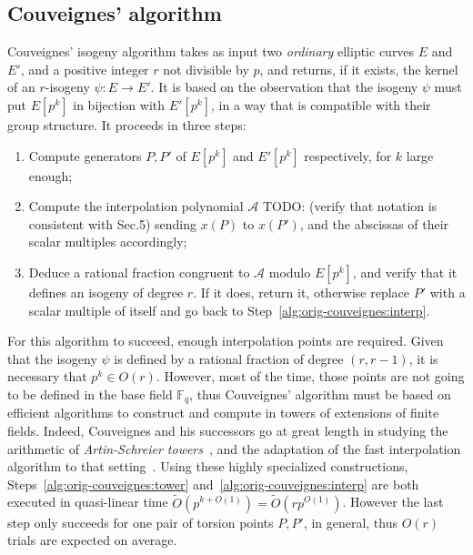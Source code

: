 \documentclass{lms}
\newcommand{\todo}[1]{{\color{red}TODO: #1}}
\newcommand{\F}{\mathbb{F}}
\newcommand{\tildO}{\tilde{O}}
\begin{document}
\subsection{Couveignes' algorithm}
\label{sec:couv-algor}

Couveignes' isogeny algorithm takes as input two \emph{ordinary}
elliptic curves $E$ and $E'$, and a positive integer $r$ not
divisible by $p$, and returns, if it exists, the kernel of an
$r$-isogeny $ψ:E\to E'$. It is based on the observation that the
isogeny $ψ$ must put $E[p^k]$ in bijection with $E'[p^k]$, in a way
that is compatible with their group structure. It proceeds in three
steps:
\begin{enumerate}
\item\label{alg:orig-couveignes:tower} Compute generators $P,P'$ of
  $E[p^k]$ and $E'[p^k]$ respectively, for $k$ large enough;
\item\label{alg:orig-couveignes:interp} Compute the interpolation
  polynomial $\mathcal{A}$ \todo{(verify that notation is consistent
    with Sec.5)} sending $x(P)$ to $x(P')$, and the abscissas of
  their scalar multiples accordingly;
\item\label{alg:orig-couveignes:rational} Deduce a rational fraction
  congruent to $\mathcal{A}$ modulo $E[p^k]$, and verify that it
  defines an isogeny of degree $r$. If it does, return it, otherwise
  replace $P'$ with a scalar multiple of itself and go back to
  Step~\ref{alg:orig-couveignes:interp}.
\end{enumerate}

For this algorithm to succeed, enough interpolation points are
required. Given that the isogeny $ψ$ is defined by a rational fraction
of degree $(r,r-1)$, it is necessary that $p^k∈O(r)$. However, most of
the time, those points are not going to be defined in the base field
$\F_q$, thus Couveignes' algorithm must be based on efficient
algorithms to construct and compute in towers of extensions of finite
fields. Indeed, Couveignes and his successors go at great length in
studying the arithmetic of \emph{Artin-Schreier
  towers}~\cite{couveignes00,df+schost12}, and the adaptation of the
fast interpolation algorithm to that setting~\cite{df10}.  Using these
highly specialized constructions,
Steps~\ref{alg:orig-couveignes:tower}
and~\ref{alg:orig-couveignes:interp} are both executed in quasi-linear
time $\tildO(p^{k+O(1)})=\tildO(rp^{O(1)})$. However the last step
only succeeds for one pair of torsion points $P,P'$, in general, thus
$O(r)$ trials are expected on average.
\end{document}
